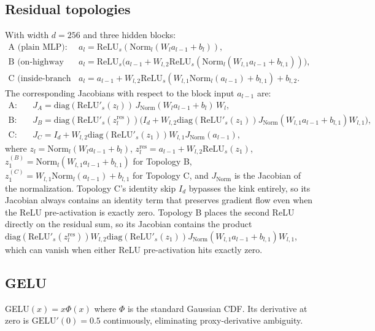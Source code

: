 \documentclass[11pt]{article}
\begin{document}
\subsection{Residual topologies}
With width $d=256$ and three hidden blocks:
\begin{align}
\text{A (plain MLP):}\quad&
a_l=\mathrm{ReLU}_s(\mathrm{Norm}_l(W_la_{l-1}+b_l)),\\
\text{B (on-highway residual):}\quad&
a_l=\mathrm{ReLU}_s\big(a_{l-1}+W_{l,2}\mathrm{ReLU}_s(\mathrm{Norm}_l(W_{l,1}a_{l-1}+b_{l,1}))\big),\\
\text{C (inside-branch Pre-Norm residual FFN):}\quad&
a_l=a_{l-1}+W_{l,2}\mathrm{ReLU}_s(W_{l,1}\mathrm{Norm}_l(a_{l-1})+b_{l,1})+b_{l,2}.
\end{align}
The corresponding Jacobians with respect to the block input $a_{l-1}$ are:
\begin{align}
\text{A:}\quad&
J_A=\mathrm{diag}(\mathrm{ReLU}'_s(z_l))\,J_{\mathrm{Norm}}(W_la_{l-1}+b_l)\,W_l,\\
\text{B:}\quad&
J_B=\mathrm{diag}(\mathrm{ReLU}'_s(z_l^{\mathrm{res}}))\bigl(I_d+W_{l,2}\mathrm{diag}(\mathrm{ReLU}'_s(z_1))J_{\mathrm{Norm}}(W_{l,1}a_{l-1}+b_{l,1})W_{l,1}\bigr),\\
\text{C:}\quad&
J_C=I_d+W_{l,2}\mathrm{diag}(\mathrm{ReLU}'_s(z_1))W_{l,1}J_{\mathrm{Norm}}(a_{l-1}),
\end{align}
where $z_l=\mathrm{Norm}_l(W_la_{l-1}+b_l)$, $z_l^{\mathrm{res}}=a_{l-1}+W_{l,2}\mathrm{ReLU}_s(z_1)$, $z_1^{(B)}=\mathrm{Norm}_l(W_{l,1}a_{l-1}+b_{l,1})$ for Topology B, $z_1^{(C)}=W_{l,1}\mathrm{Norm}_l(a_{l-1})+b_{l,1}$ for Topology C, and $J_{\mathrm{Norm}}$ is the Jacobian of the normalization. Topology C's identity skip $I_d$ bypasses the kink entirely, so its Jacobian always contains an identity term that preserves gradient flow even when the ReLU pre-activation is exactly zero. Topology B places the second ReLU directly on the residual sum, so its Jacobian contains the product $\mathrm{diag}(\mathrm{ReLU}'_s(z_l^{\mathrm{res}}))W_{l,2}\mathrm{diag}(\mathrm{ReLU}'_s(z_1))J_{\mathrm{Norm}}(W_{l,1}a_{l-1}+b_{l,1})W_{l,1}$, which can vanish when either ReLU pre-activation hits exactly zero.

\subsection{GELU}
GELU$(x)=x\Phi(x)$ where $\Phi$ is the standard Gaussian CDF. Its derivative at zero is $\mathrm{GELU}'(0)=0.5$ continuously, eliminating proxy-derivative ambiguity.
\end{document}
